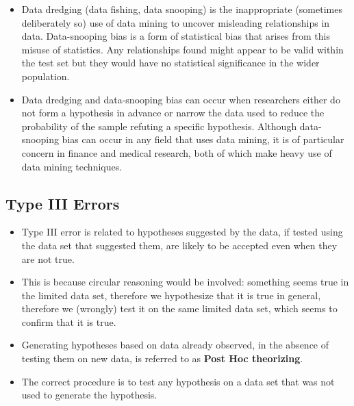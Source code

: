 \documentclass[a4paper,12pt]{article}
\begin{document}
\begin{itemize}
	\item Data dredging (data fishing, data snooping) is the inappropriate (sometimes deliberately so) use of data mining to uncover misleading relationships in data. Data-snooping bias is a form of statistical bias that arises from this misuse of statistics. Any relationships found might appear to be valid within the test set but they would have no statistical significance in the wider population.
	
	\item Data dredging and data-snooping bias can occur when researchers either do not form a hypothesis in advance or narrow the data used to reduce the probability of the sample refuting a specific hypothesis. Although data-snooping bias can occur in any field that uses data mining, it is of particular concern in finance and medical research, both of which make heavy use of data mining techniques.
\end{itemize}

\subsection{Type III Errors}

\begin{itemize}
	\item Type III error is related to hypotheses suggested by the data, if tested using the data set that suggested them, are likely to be accepted even when they are not true. 
	
	\item This is because circular reasoning would be involved: something seems true in the limited data set, therefore we hypothesize that it is true in general, therefore we (wrongly) test it on the same limited data set, which seems to confirm that it is true. 
	
	\item Generating hypotheses based on data already observed, in the absence of testing them on new data, is referred to as \textbf{Post Hoc theorizing}.
	
	
	\item The correct procedure is to test any hypothesis on a data set that was not used to generate the hypothesis.
\end{itemize}
\newpage
\end{document}
